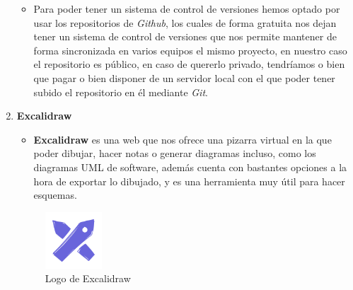 \documentclass[a4paper]{article}
\begin{document}
\begin{enumerate}
\begin{itemize}
              \item Para poder tener un sistema de control de versiones hemos optado por usar los repositorios de \textit{Github}, los cuales de forma gratuita nos dejan tener un sistema de control de versiones que nos permite mantener de forma sincronizada en varios equipos el mismo proyecto, en nuestro caso el repositorio es público, en caso de quererlo privado, tendríamos o bien que pagar o bien disponer de un servidor local con el que poder tener subido el repositorio en él mediante \textit{Git}.
          \end{itemize}
    \item \textbf{Excalidraw}
          \begin{itemize}
              \item \textbf{Excalidraw} es una web que nos ofrece una pizarra virtual en la que poder dibujar, hacer notas o generar diagramas incluso, como los diagramas UML de software, además cuenta con bastantes opciones a la hora de exportar lo dibujado, y es una herramienta muy útil para hacer esquemas.
          \end{itemize}
          \begin{figure}[!ht]
            \centering
            \includegraphics[width=0.2\textwidth]{Images/logoExcalidraw.png} 
            \caption{Logo de Excalidraw}
            \label{fig:excalidraw}
        \end{figure}
\end{enumerate}
\clearpage
\end{document}
